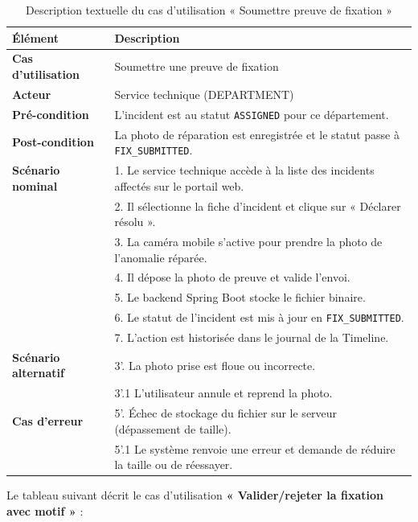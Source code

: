 \begin{table}[H]
    \centering
    \caption{Description textuelle du cas d'utilisation « Soumettre preuve de fixation »}
    \label{tab:txt_soumettre_preuve}
    \vspace{0.2cm}
    \small
    \begin{tabularx}{\textwidth}{|l|X|}
        \hline
        \textbf{Élément} & \textbf{Description} \\ \hline
        \textbf{Cas d’utilisation} & Soumettre une preuve de fixation \\ \hline
        \textbf{Acteur} & Service technique (DEPARTMENT) \\ \hline
        \textbf{Pré-condition} & L'incident est au statut \texttt{ASSIGNED} pour ce département. \\ \hline
        \textbf{Post-condition} & La photo de réparation est enregistrée et le statut passe à \texttt{FIX\_SUBMITTED}. \\ \hline
        \textbf{Scénario nominal} &
        1. Le service technique accède à la liste des incidents affectés sur le portail web.\\
        & 2. Il sélectionne la fiche d'incident et clique sur « Déclarer résolu ».\\
        & 3. La caméra mobile s'active pour prendre la photo de l'anomalie réparée.\\
        & 4. Il dépose la photo de preuve et valide l'envoi.\\
        & 5. Le backend Spring Boot stocke le fichier binaire.\\
        & 6. Le statut de l'incident est mis à jour en \texttt{FIX\_SUBMITTED}.\\
        & 7. L'action est historisée dans le journal de la Timeline. \\ \hline
        \textbf{Scénario alternatif} &
        3'. La photo prise est floue ou incorrecte.\\
        & 3'.1 L'utilisateur annule et reprend la photo. \\ \hline
        \textbf{Cas d’erreur} &
        5'. Échec de stockage du fichier sur le serveur (dépassement de taille).\\
        & 5'.1 Le système renvoie une erreur et demande de réduire la taille ou de réessayer. \\ \hline
    \end{tabularx}
\end{table}

Le tableau suivant décrit le cas d'utilisation \textbf{« Valider/rejeter la fixation avec motif »} :

